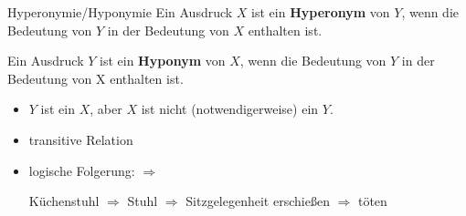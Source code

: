 
\begin{frame}

\begin{block}{Hyperonymie/Hyponymie}
Ein Ausdruck $X$ ist ein \textbf{Hyperonym} von $Y$, wenn die Bedeutung von $Y$ in der Bedeutung von $X$ enthalten ist. 

Ein Ausdruck $Y$ ist ein \textbf{Hyponym} von $X$, wenn die Bedeutung von $Y$ in der Bedeutung von X enthalten ist.
\end{block}


\begin{itemize}
	\item $Y$ ist ein $X$, aber $X$ ist nicht (notwendigerweise) ein $Y$.
	\item transitive Relation
	\item logische Folgerung: $\Rightarrow$
	
	\eal 
		\ex Küchenstuhl $\Rightarrow$ Stuhl $\Rightarrow$ Sitzgelegenheit
		\ex erschie\ss{}en $\Rightarrow$ töten
	\zl
		
\end{itemize}

\end{frame}



